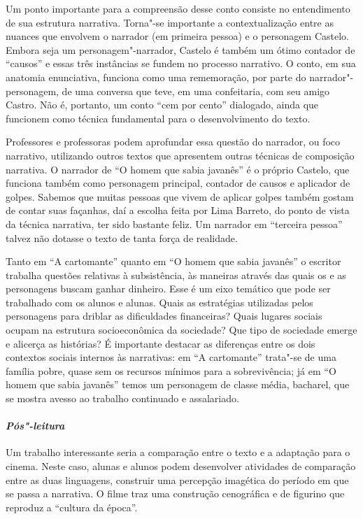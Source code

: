 \documentclass[11pt]{extarticle}
\begin{document}
Um ponto importante para a compreensão desse conto consiste no
entendimento de sua estrutura narrativa. Torna"-se importante a
contextualização entre as nuances que envolvem o narrador (em primeira
pessoa) e o personagem Castelo. Embora seja um personagem"-narrador,
Castelo é também um ótimo contador de ``causos'' e essas três instâncias
se fundem no processo narrativo. O conto, em sua anatomia enunciativa,
funciona como uma rememoração, por parte do narrador"-personagem, de uma
conversa que teve, em uma confeitaria, com seu amigo Castro. Não é,
portanto, um conto ``cem por cento'' dialogado, ainda que funcionem 
como técnica fundamental para o desenvolvimento do texto.

Professores e professoras podem aprofundar essa questão do narrador, ou
foco narrativo, utilizando outros textos que apresentem outras técnicas
de composição narrativa. O narrador de ``O homem que sabia
javanês'' é o próprio Castelo, que funciona também como personagem
principal, contador de causos e aplicador de golpes. Sabemos que muitas
pessoas que vivem de aplicar golpes também gostam de contar suas
façanhas, daí a escolha feita por Lima Barreto, do ponto de vista da
técnica narrativa, ter sido bastante feliz. Um narrador em ``terceira
pessoa'' talvez não dotasse o texto de tanta força de realidade.

Tanto em ``A cartomante'' quanto em ``O homem
que sabia javanês'' o escritor trabalha questões relativas à
subsistência, às maneiras através das quais os e as personagens buscam
ganhar dinheiro. Esse é um eixo temático que pode ser trabalhado com os
alunos e alunas. Quais as estratégias utilizadas pelos personagens para
driblar as dificuldades financeiras? Quais lugares sociais ocupam na
estrutura socioeconômica da sociedade? Que tipo de sociedade emerge e
alicerça as histórias? É importante destacar as diferenças entre os dois
contextos sociais internos às narrativas: em ``A
cartomante'' trata"-se de uma família pobre, quase sem os recursos
mínimos para a sobrevivência; já em ``O homem que sabia
javanês'' temos um personagem de classe média, bacharel, que se mostra
avesso ao trabalho continuado e assalariado.

\paragraph{\textit{Pós"-leitura}}

Um trabalho interessante seria a comparação entre o texto e a
adaptação para o cinema. Neste caso, alunas e alunos podem desenvolver
atividades de comparação entre as duas linguagens, construir uma
percepção imagética do período em que se passa a narrativa. O filme traz
uma construção cenográfica e de figurino que reproduz a ``cultura da
época''.
\end{document}
